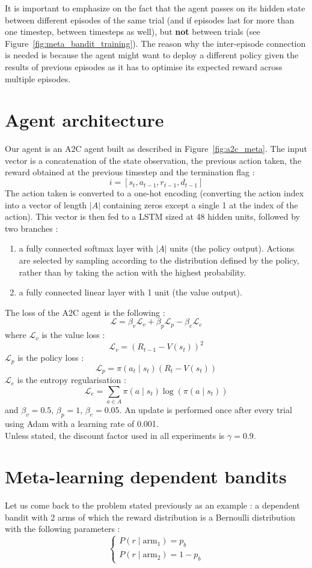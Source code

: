 It is important to emphasize on the fact that the agent passes on its hidden
state between different episodes of the same trial (and if episodes last for
more than one timestep, between timesteps as well), but \textbf{not} between
trials (see Figure~\ref{fig:meta_bandit_training}).
The reason why the inter-episode connection is needed is because
the agent might want to deploy a different policy given the results of 
previous episodes as it has to optimise its expected reward across multiple
episodes.

\section{Agent architecture}
Our agent is an A2C agent built as described in Figure~\ref{fig:a2c_meta}.
The input vector is a concatenation of the state observation, the previous
action taken, the reward obtained at the previous timestep and the termination
flag :
$$ i = [s_t, a_{t-1}, r_{t-1}, d_{t-1}] $$
The action taken is converted to a one-hot encoding (converting the action
index into a vector of length $|A|$ containing zeros except a single 1 at the
index of the action). This vector is then fed to a LSTM sized at 48 hidden
units, followed by two branches :
\begin{enumerate}
	\item a fully connected softmax layer with $|A|$ units (the policy
		output). Actions are selected by sampling according to the
		distribution defined by the policy, rather than by taking the
		action with the highest probability.
	\item a fully connected linear layer with 1 unit (the value output).
\end{enumerate}
The loss of the A2C agent is the following : 
$$ \mathcal{L} = \beta_v \mathcal{L}_v + \beta_p \mathcal{L}_p - \beta_e 
 \mathcal{L}_e $$
where $\mathcal{L}_v$ is the value loss : 
$$ \mathcal{L}_v = (R_{t-1} - V(s_t))^2$$
$\mathcal{L}_p$ is the policy loss : 
$$ \mathcal{L}_p = \pi(a_t \mid s_t) (R_t - V(s_t))$$
$\mathcal{L}_e$ is the entropy regularisation : 
$$ \mathcal{L}_e = \sum\limits_{a \in A}\pi(a \mid s_t)\log(\pi(a \mid s_t))$$
and $\beta_v = 0.5$, $\beta_p = 1$, $\beta_e = 0.05$. An update is performed
once after every trial using Adam \cite{adam} with a learning rate of 0.001.\\

Unless stated, the discount factor used in all experiments is $\gamma=0.9$. 


\section{Meta-learning dependent bandits}
Let us come back to the problem stated previously as an example : a dependent
bandit with 2 arms of which the reward distribution is a Bernoulli distribution
with the following parameters : 
$$ \begin{cases} P(r \mid \text{arm}_1) = p_b \\ 
P(r \mid \text{arm}_2) = 1 - p_b  \end{cases} $$

